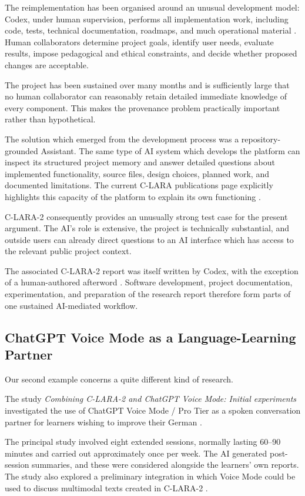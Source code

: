 The reimplementation has been organised around an unusual development model: Codex, under human supervision, performs all implementation work, including code, tests, technical documentation, roadmaps, and much operational material \citep{bediEtAl2026clara2}. Human collaborators determine project goals, identify user needs, evaluate results, impose pedagogical and ethical constraints, and decide whether proposed changes are acceptable.

The project has been sustained over many months and is sufficiently large that no human collaborator can reasonably retain detailed immediate knowledge of every component. This makes the provenance problem practically important rather than hypothetical.

The solution which emerged from the development process was a repository-grounded Assistant. The same type of AI system which develops the platform can inspect its structured project memory and answer detailed questions about implemented functionality, source files, design choices, planned work, and documented limitations. The current C-LARA publications page explicitly highlights this capacity of the platform to explain its own functioning \citep{claradocuments2026}.

C-LARA-2 consequently provides an unusually strong test case for the present argument. The AI's role is extensive, the project is technically substantial, and outside users can already direct questions to an AI interface which has access to the relevant public project context.

The associated C-LARA-2 report was itself written by Codex, with the exception of a human-authored afterword \citep{bediEtAl2026clara2}. Software development, project documentation, experimentation, and preparation of the research report therefore form parts of one sustained AI-mediated workflow.


\subsection{ChatGPT Voice Mode as a Language-Learning Partner}

Our second example concerns a quite different kind of research.

The study \emph{Combining C-LARA-2 and ChatGPT Voice Mode: Initial experiments} investigated the use of ChatGPT Voice Mode / Pro Tier as a spoken conversation partner for learners wishing to improve their German \citep{wrightEtAl2026voice}.

The principal study involved eight extended sessions, normally lasting 60--90 minutes and carried out approximately once per week. The AI generated post-session summaries, and these were considered alongside the learners' own reports. The study also explored a preliminary integration in which Voice Mode could be used to discuss multimodal texts created in C-LARA-2 \citep{wrightEtAl2026voice}.

